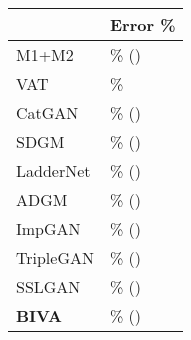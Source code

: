 \documentclass{article}
\def\nm{BIVA\xspace}
\def\abovestrut#1{\rule[0in]{0in}{#1}\ignorespaces}
\def\abovespace{\abovestrut{0.20in}}
\begin{document}
\begin{table}[t]
\begin{minipage}{0.49\textwidth}
\begin{center}
\begin{small}
\begin{sc}
\begin{tabular}{ll}
\abovespace
   &  Error \%\\
\hline
\abovespace 
M1+M2 {\scriptsize\citep{Kingma14}} & \% () \\
VAT {\scriptsize\citep{Miyato15}} & \% \\
CatGAN {\scriptsize\citep{Springenberg2015}} & \% () \\
SDGM {\scriptsize\citep{Maaloe2016}} & \% () \\
LadderNet {\scriptsize\citep{Rasmus15}} & \% ()\\ 
ADGM {\scriptsize\citep{Maaloe2016}} & \% () \\
ImpGAN {\scriptsize\citep{Salimans2016}} & \% () \\
TripleGAN {\scriptsize\citep{Li17}} & \% ()\\
SSLGAN {\scriptsize\citep{Dai17}} & \% () \\
\abovespace
\textbf{\nm} & \% ()\\
\hline
\end{tabular}
\end{sc}
\end{small}
\end{center}
        \end{minipage}


\end{table}
\end{document}
